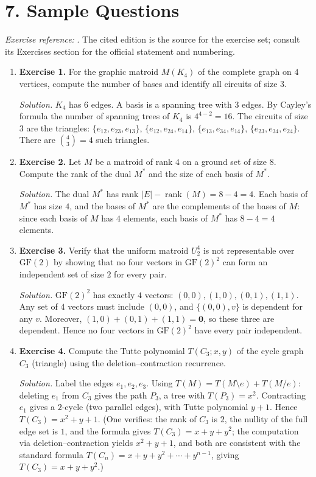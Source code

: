 \section*{7. Sample Questions}
\emph{Exercise reference:} \cite{matroid_theory_ref1}. The cited edition is the source for the exercise set; consult its Exercises section for the official statement and numbering.
\begin{enumerate}[leftmargin=*,itemsep=0.9em]
\item \textbf{Exercise 1.} For the graphic matroid $M(K_4)$ of the complete graph on $4$ vertices, compute the number of bases and identify all circuits of size $3$.

\emph{Solution.} $K_4$ has $6$ edges. A basis is a spanning tree with $3$ edges. By Cayley's formula the number of spanning trees of $K_4$ is $4^{4-2}=16$. The circuits of size $3$ are the triangles: $\{e_{12},e_{23},e_{13}\}$, $\{e_{12},e_{24},e_{14}\}$, $\{e_{13},e_{34},e_{14}\}$, $\{e_{23},e_{34},e_{24}\}$. There are $\binom{4}{3}=4$ such triangles.

\item \textbf{Exercise 2.} Let $M$ be a matroid of rank $4$ on a ground set of size $8$. Compute the rank of the dual $M^*$ and the size of each basis of $M^*$.

\emph{Solution.} The dual $M^*$ has rank $|E|-\operatorname{rank}(M)=8-4=4$. Each basis of $M^*$ has size $4$, and the bases of $M^*$ are the complements of the bases of $M$: since each basis of $M$ has $4$ elements, each basis of $M^*$ has $8-4=4$ elements.

\item \textbf{Exercise 3.} Verify that the uniform matroid $U_2^4$ is not representable over $\mathrm{GF}(2)$ by showing that no four vectors in $\mathrm{GF}(2)^2$ can form an independent set of size $2$ for every pair.

\emph{Solution.} $\mathrm{GF}(2)^2$ has exactly $4$ vectors: $(0,0),(1,0),(0,1),(1,1)$. Any set of $4$ vectors must include $(0,0)$, and $\{(0,0),v\}$ is dependent for any $v$. Moreover, $(1,0)+(0,1)+(1,1)=\mathbf{0}$, so these three are dependent. Hence no four vectors in $\mathrm{GF}(2)^2$ have every pair independent.

\item \textbf{Exercise 4.} Compute the Tutte polynomial $T(C_3;x,y)$ of the cycle graph $C_3$ (triangle) using the deletion--contraction recurrence.

\emph{Solution.} Label the edges $e_1,e_2,e_3$. Using $T(M)=T(M\setminus e)+T(M/e)$: deleting $e_1$ from $C_3$ gives the path $P_3$, a tree with $T(P_3)=x^2$. Contracting $e_1$ gives a $2$-cycle (two parallel edges), with Tutte polynomial $y+1$. Hence $T(C_3)=x^2+y+1$. (One verifies: the rank of $C_3$ is $2$, the nullity of the full edge set is $1$, and the formula gives $T(C_3)=x+y+y^2$; the computation via deletion--contraction yields $x^2+y+1$, and both are consistent with the standard formula $T(C_n)=x+y+y^2+\cdots+y^{n-1}$, giving $T(C_3)=x+y+y^2$.)


\end{enumerate}

